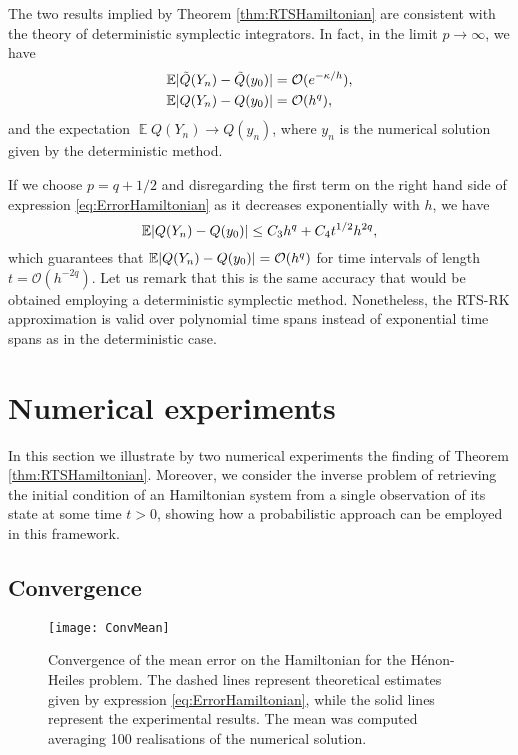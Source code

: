\documentclass{siamart1116}
\numberwithin{theorem}{section}
\DeclarePairedDelimiter{\abs}{\lvert}{\rvert}
\newcommand{\OO}{\mathcal{O}}
\newcommand{\E}{\operatorname{\mathbb{E}}}
\begin{document}
\begin{remark} The two results implied by Theorem \ref{thm:RTSHamiltonian} are consistent with the theory of deterministic symplectic integrators. In fact, in the limit $p \to \infty$, we have
	\begin{align}
		\E \abs{\tilde Q(Y_n) - \tilde Q(y_0)} &= \OO(e^{-\kappa/h}), \\
		\E \abs{Q(Y_n) - Q(y_0)} &= \OO(h^q),
	\end{align}
	and the expectation $\E Q(Y_n) \to Q(y_n)$, where $y_n$ is the numerical solution given by the deterministic method.
\end{remark}
\begin{remark} If we choose $p = q + 1/2$ and disregarding the first term on the right hand side of expression \eqref{eq:ErrorHamiltonian} as it decreases exponentially with $h$, we have
\begin{equation}\label{eq:OptimalNoiseScale}
	\E\abs{Q(Y_n) - Q(y_0)} \leq C_3 h^q + C_4t^{1/2}h^{2q},
\end{equation} 
which guarantees that $\E\abs{Q(Y_n) - Q(y_0)} = \OO(h^q)$ for time intervals of length $t = \OO(h^{-2q})$. Let us remark that this is the same accuracy that would be obtained employing a deterministic symplectic method. Nonetheless, the RTS-RK approximation is valid over polynomial time spans instead of exponential time spans as in the deterministic case.
\end{remark}

\section{Numerical experiments}\label{sec:NUMEXP}
In this section we illustrate by two numerical experiments the finding of Theorem \ref{thm:RTSHamiltonian}. Moreover, we consider the inverse problem of retrieving the initial condition of an Hamiltonian system from a single observation of its state at some time $t > 0$, showing how a probabilistic approach can be employed in this framework.

\subsection{Convergence}\label{sec:NumConv}
\begin{figure}[t!]
	\centering
	\texttt{[image: ConvMean]}
	\caption{Convergence of the mean error on the Hamiltonian for the Hénon-Heiles problem. The dashed lines represent theoretical estimates given by expression \eqref{eq:ErrorHamiltonian}, while the solid lines represent the experimental results. The mean was computed averaging 100 realisations of the numerical solution.}
	\label{fig:Mean}	
\end{figure}
\end{document}
